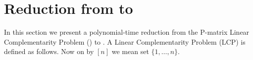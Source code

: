 
\section{Reduction from \PLCP to \EOPL}
\label{sec:PLCPtoEOPL}

In this section we present a polynomial-time reduction from the P-matrix Linear
Complementarity Problem (\PLCP) to \EOPL.
A Linear Complementarity Problem (LCP) is defined as follows. Now on by $[n]$ we mean set $\{1,\dots,n\}$.

